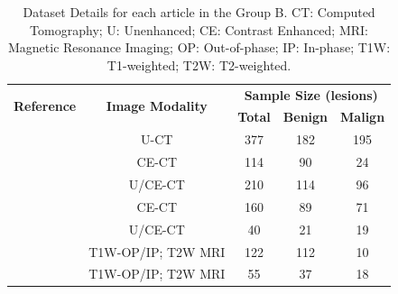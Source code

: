 \documentclass{article}
\begin{document}
\begin{table}[]
    \centering
    \begin{tabular}{ccccc}\toprule
        \multirow{2}{*}{\textbf{Reference}} & \multirow{2}{*}{\textbf{Image Modality}} & \multicolumn{3}{c}{\textbf{Sample Size (lesions)}}
        \\\cmidrule(lr){3-5}
                                            &                                          & \textbf{Total}                                     & \textbf{Benign} & \textbf{Malign} \\\midrule
        \cite{Shoemaker2018}                & U-CT                                     & 377                                                & 182             & 195             \\
        \cite{Koyuncu2019}                  & CE-CT                                    & 114                                                & 90              & 24              \\
        \cite{Li2019}                       & U/CE-CT                                  & 210                                                & 114             & 96              \\
        \cite{Andersen2021}                 & CE-CT                                    & 160                                                & 89              & 71              \\
        \cite{Moawad2021}                   & U/CE-CT                                  & 40                                                 & 21              & 19              \\
        \cite{Barstugan2020}                & T1W-OP/IP; T2W MRI                       & 122                                                & 112               & 10             \\
        \cite{Stanzione2021}                & T1W-OP/IP; T2W MRI                       & 55                                                 & 37              & 18              \\
        \bottomrule
    \end{tabular}
    \caption{Dataset Details for each article in the Group B. CT: Computed Tomography; U: Unenhanced; CE: Contrast Enhanced; MRI: Magnetic Resonance Imaging; OP: Out-of-phase; IP: In-phase; T1W: T1-weighted; T2W: T2-weighted.}
    \label{tab:data_B}
\end{table}
\end{document}
